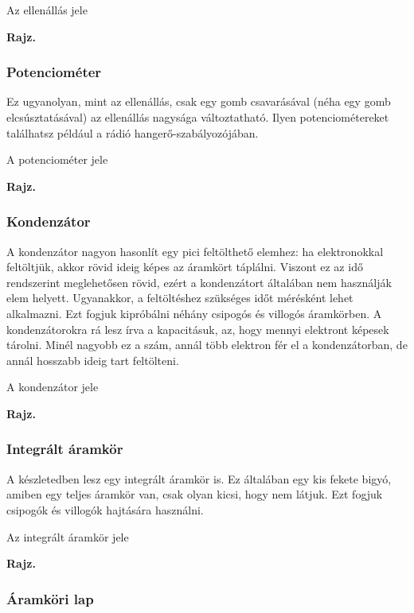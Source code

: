 \documentclass[16pt]{scrreprt}
\begin{document}
Az ellenállás jele

\textbf{Rajz.}



\subsubsection{Potenciométer}

Ez ugyanolyan, mint az ellenállás, csak egy gomb csavarásával (néha egy gomb elcsúsztatásával) az ellenállás nagysága változtatható. Ilyen potenciométereket találhatsz például a rádió hangerő-szabályozójában. 

A potenciométer jele

\textbf{Rajz.}



\subsubsection{Kondenzátor}

A kondenzátor nagyon hasonlít egy pici feltölthető elemhez: ha elektronokkal feltöltjük, akkor rövid ideig képes az áramkört táplálni. Viszont ez az idő rendszerint meglehetősen rövid, ezért a kondenzátort általában nem használják elem helyett. Ugyanakkor, a feltöltéshez szükséges időt mérésként lehet alkalmazni. Ezt fogjuk kipróbálni néhány csipogós és villogós áramkörben. A kondenzátorokra rá lesz írva a kapacitásuk, az, hogy mennyi elektront képesek tárolni. Minél nagyobb ez a szám, annál több elektron fér el a kondenzátorban, de annál hosszabb ideig tart feltölteni.

A kondenzátor jele

\textbf{Rajz.}



\subsubsection{Integrált áramkör}

A készletedben lesz egy integrált áramkör is. Ez általában egy kis fekete bigyó, amiben egy teljes áramkör van, csak olyan kicsi, hogy nem látjuk. Ezt fogjuk csipogók és villogók hajtására használni. 

Az integrált áramkör jele

\textbf{Rajz.}



\subsubsection{Áramköri lap}
\end{document}
